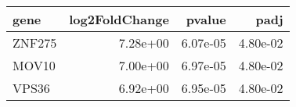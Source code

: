 \begin{tabular}{lrrr}
\toprule
  gene &  log2FoldChange &   pvalue &     padj \\
\midrule
ZNF275 &        7.28e+00 & 6.07e-05 & 4.80e-02 \\
 MOV10 &        7.00e+00 & 6.97e-05 & 4.80e-02 \\
 VPS36 &        6.92e+00 & 6.95e-05 & 4.80e-02 \\
\bottomrule
\end{tabular}
